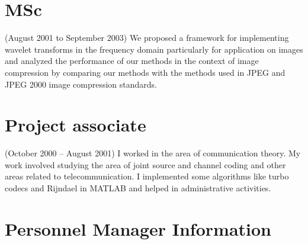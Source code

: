 \documentclass[10pt]{article} %
\begin{document}
\begin{resume}
{\section{\textnormal{MSc}}\label{sec:mastersAbstract}
(August 2001 to September 2003)
We proposed a
framework for implementing wavelet transforms in the frequency domain
particularly for application on images and analyzed the performance of our
methods in the context of image compression by comparing our methods with
the methods used in JPEG and JPEG 2000 image compression
standards. 
\section{\textnormal{Project associate}}\label{sec:turbo}
(October 2000 -- August 2001)
I worked in the area of communication theory. My work involved studying
the area of joint source and channel coding and other areas related to
telecommunication. I implemented some algorithms like turbo codecs and
Rijndael in MATLAB and helped in administrative activities.

\newpage
\section{Personnel Manager Information}

}
\end{resume}
\end{document}
